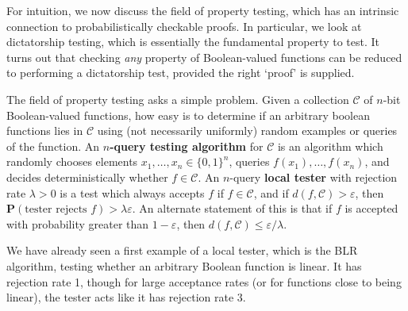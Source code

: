 For intuition, we now discuss the field of property testing, which has an intrinsic connection to probabilistically checkable proofs. In particular, we look at dictatorship testing, which is essentially the fundamental property to test. It turns out that checking {\it any} property of Boolean-valued functions can be reduced to performing a dictatorship test, provided the right `proof' is supplied.

The field of property testing asks a simple problem. Given a collection $\mathcal{C}$ of $n$-bit Boolean-valued functions, how easy is to determine if an arbitrary boolean functions lies in $\mathcal{C}$ using (not necessarily uniformly) random examples or queries of the function. An {\bf $n$-query testing algorithm} for $\mathcal{C}$ is an algorithm which randomly chooses elements $x_1, \dots, x_n \in \{ 0, 1 \}^n$, queries $f(x_1), \dots, f(x_n)$, and decides deterministically whether $f \in \mathcal{C}$. An $n$-query {\bf local tester} with rejection rate $\lambda > 0$ is a test which always accepts $f$ if $f \in \mathcal{C}$, and if $d(f,\mathcal{C}) > \varepsilon$, then $\mathbf{P}(\text{tester rejects $f$}) > \lambda \varepsilon$. An alternate statement of this is that if $f$ is accepted with probability greater than $1 - \varepsilon$, then $d(f,\mathcal{C}) \leq \varepsilon/\lambda$.

\begin{example}
    We have already seen a first example of a local tester, which is the BLR algorithm, testing whether an arbitrary Boolean function is linear. It has rejection rate 1, though for large acceptance rates (or for functions close to being linear), the tester acts like it has rejection rate $3$.
\end{example}

